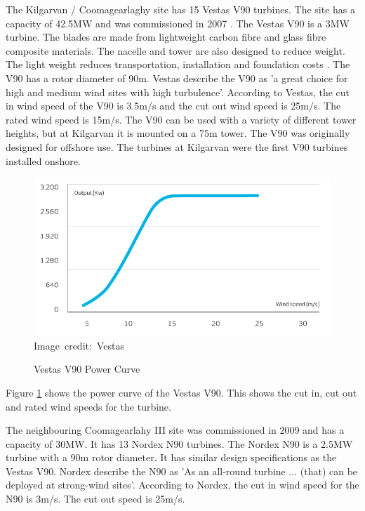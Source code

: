 \documentclass[12pt]{article} %
\begin{document}
The Kilgarvan / Coomagearlaghy site has 15 Vestas V90 turbines. The site has a capacity of 42.5MW and was commissioned in 2007 \cite{iwea}.
The Vestas V90 is a 3MW turbine. The blades are made from lightweight carbon fibre and glass fibre composite materials. The nacelle and tower are also designed to reduce weight. The light weight reduces transportation, installation and foundation costs \cite{v90-3.0}. The V90 has a rotor diameter of 90m.
Vestas \cite{v90-3.0} describe the V90 as 'a great choice for high and medium wind sites with high turbulence'. 
According to Vestas, the cut in wind speed of the V90 is 3.5m/s and the cut out wind speed is 25m/s. The rated wind speed is 15m/s.
The V90 can be used with a variety of different tower heights, but at Kilgarvan it is mounted on a 75m tower. The V90 was originally designed for offshore use. The turbines at Kilgarvan were the first V90 turbines installed onshore.

\begin{figure}[h]
  \begin{center}
    \includegraphics[width=1\textwidth]{PowerCurveV9030MW}
    \hbox{\scriptsize Image credit: Vestas \cite{v90-3.0}}
  \end{center}
  \caption{Vestas V90 Power Curve}
  \label{fig:v90powercurve}
\end{figure}

Figure \ref{fig:v90powercurve} shows the power curve of the Vestas V90. This shows the cut in, cut out and rated wind speeds for the turbine.


The neighbouring Coomagearlahy III site was commissioned in 2009 and has a capacity of 30MW. It has 13 Nordex N90 turbines. The Nordex N90 is a 2.5MW turbine with a 90m rotor diameter. It has similar design specifications as the Vestas V90. Nordex \cite{n90} describe the N90 as 'As an all-round turbine ... (that) can be deployed at strong-wind sites'.
According to Nordex, the cut in wind speed for the N90 is 3m/s. The cut out speed is 25m/s.
\end{document}
